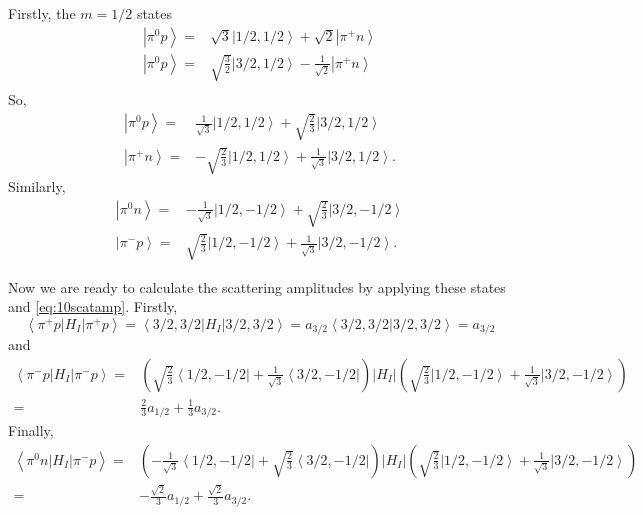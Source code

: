 \documentclass[main.tex]{subfiles}
\begin{document}
Firstly, the $m=1/2$ states
\begin{align}
\left|\pi^0p\right>=&\sqrt{3}\left|1/2,1/2\right>+\sqrt{2}\left|\pi^+n\right>\\
\left|\pi^0p\right>=&\sqrt{\frac{3}{2}}\left|3/2,1/2\right>-\frac{1}{\sqrt{2}}\left|\pi^+n\right>\\
\end{align}
So,
\begin{align}
\left|\pi^0p\right>=&\frac{1}{\sqrt{3}}\left|1/2,1/2\right>+\sqrt{\frac{2}{3}}\left|3/2,1/2\right>\\
\left|\pi^+n\right>=&-\sqrt{\frac{2}{3}}\left|1/2,1/2\right>+\frac{1}{\sqrt{3}}\left|3/2,1/2\right>.
\end{align}
Similarly,
\begin{align}
\left|\pi^0n\right>=&-\frac{1}{\sqrt{3}}\left|1/2,-1/2\right>+\sqrt{\frac{2}{3}}\left|3/2,-1/2\right>\\
\left|\pi^-p\right>=&\sqrt{\frac{2}{3}}\left|1/2,-1/2\right>+\frac{1}{\sqrt{3}}\left|3/2,-1/2\right>.
\end{align}

Now we are ready to calculate the scattering amplitudes by applying these states and \eqref{eq:10scatamp}. Firstly,
\begin{equation}
\left<\pi^+p|H_I|\pi^+p\right>=\left<3/2,3/2|H_I|3/2,3/2\right>=a_{3/2}\left<3/2,3/2|3/2,3/2\right>=a_{3/2}
\end{equation}
 and
 \begin{align}
 \left<\pi^-p|H_I|\pi^-p\right>=&\left(\sqrt{\frac{2}{3}}\left<1/2,-1/2\right|+\frac{1}{\sqrt{3}}\left<3/2,-1/2\right|\right)|H_I|\left(\sqrt{\frac{2}{3}}\left|1/2,-1/2\right>+\frac{1}{\sqrt{3}}\left|3/2,-1/2\right>\right)\\
 =&\frac{2}{3}a_{1/2}+\frac{1}{3}a_{3/2}.
 \end{align}
Finally,
 \begin{align}
 \left<\pi^0n|H_I|\pi^-p\right>=&\left(-\frac{1}{\sqrt{3}}\left<1/2,-1/2\right|+\sqrt{\frac{2}{3}}\left<3/2,-1/2\right|\right)|H_I|\left(\sqrt{\frac{2}{3}}\left|1/2,-1/2\right>+\frac{1}{\sqrt{3}}\left|3/2,-1/2\right>\right)\\
 =&-\frac{\sqrt{2}}{3}a_{1/2}+\frac{\sqrt{2}}{3}a_{3/2}.
 \end{align}
\end{document}
